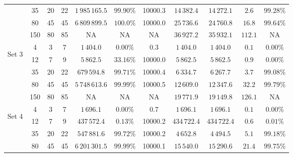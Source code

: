 \documentclass[../main.tex]{subfiles}
\begin{document}
\begin{table}
\begin{adjustbox}{width=0.95\columnwidth,center}
\begin{tabular}{|cccc|ccc|ccc|c|}
                        & 35      & 20    & 22    & $1\,985\,165.5$ & $99.90\%$     & 10000.3   & $14\,382.4$   & $14\,272.1$   & $2.6$     & $99.28\%$  \\
                        & 80      & 45    & 45    & $6\,809\,899.5$ & $100.0\%$     & 10000.0   & $25\,736.6$   & $24\,760.8$   & $16.8$    & $99.64\%$  \\
                        & 150     & 80    & 85    & NA              & NA            & NA        & $36\,927.2$   & $35\,932.1$   & $112.1$   & NA  \\
            \hline
                \multirow{5}{*}{\begin{sideways} Set 3 \end{sideways}}  
                        & 4       & 3     & 7     & $1\,404.0$      & $0.00\%$      & 0.3       & $1\,404.0$    & $1\,404.0$    & $0.1$     & $0.00\%$  \\
                        & 12      & 7     & 9     & $5\,862.5$      & $33.16\%$     & 10000.0   & $5\,862.5$    & $5\,862.5$    & $0.9$     & $0.00\%$  \\
                        & 35      & 20    & 22    & $679\,594.8$    & $99.71\%$     & 10000.4   & $6\,334.7$    & $6\,267.7$    & $3.7$     & $99.08\%$  \\
                        & 80      & 45    & 45    & $5\,748\,613.6$ & $99.99\%$     & 10000.5   & $12\,609.0$   & $12\,347.6$   & $32.2$    & $99.79\%$  \\
                        & 150     & 80    & 85    & NA              & NA            & NA        & $19\,771.9$   & $19\,149.8$   & $126.1$   & NA  \\
            \hline
                \multirow{5}{*}{\begin{sideways} Set 4 \end{sideways}}  
                        & 4       & 3     & 7     & $1\,696.1$      & $0.00\%$      & 0.7       & $1\,696.1$    & $1\,696.1$    & $0.1$     & $0.00\%$  \\
                        & 12      & 7     & 9     & $437\,572.4$    & $0.13\%$      & 10000.2   & $434\,722.4$  & $434\,722.4$  & $0.6$     & $0.01\%$  \\
                        & 35      & 20    & 22    & $547\,881.6$    & $99.72\%$     & 10000.2   & $4\,652.8$    & $4\,494.5$    & $5.1$     & $99.18\%$  \\
                        & 80      & 45    & 45    & $6\,201\,301.5$ & $99.99\%$     & 10000.1   & $15\,540.0$   & $15\,290.6$   & $21.4$    & $99.75\%$  \\

\end{tabular}
\end{adjustbox}
\end{table}
\end{document}
